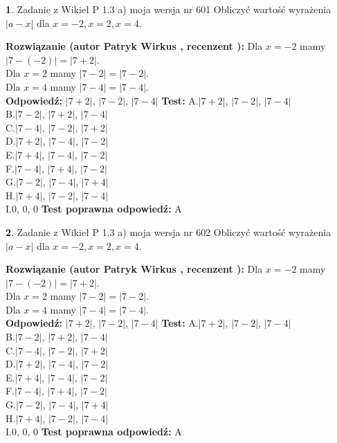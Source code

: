 \documentclass[12pt, a4paper]{article}
\theoremstyle{definition} %
\newtheorem{zad}{}
\newcommand{\zadStart}[1]{\begin{zad}#1\newline}
\newcommand{\zadStop}{\end{zad}}
\newcommand{\rozwStart}[2]{\noindent \textbf{Rozwiązanie (autor #1 , recenzent #2): }\newline}
\newcommand{\rozwStop}{\newline}
\newcommand{\odpStart}{\noindent \textbf{Odpowiedź:}\newline}
\newcommand{\odpStop}{\newline}
\newcommand{\testStart}{\noindent \textbf{Test:}\newline}
\newcommand{\testStop}{\newline}
\newcommand{\kluczStart}{\noindent \textbf{Test poprawna odpowiedź:}\newline}
\newcommand{\kluczStop}{\newline}
\begin{document}
\zadStart{Zadanie z Wikieł P 1.3 a) moja wersja nr 601}
Obliczyć wartość wyrażenia $|a - x|$ dla $x=-2,x=2,x=4$.
\zadStop
\rozwStart{Patryk Wirkus}{}
Dla $x = -2$ mamy $|7 - (-2)| = |7 + 2|$.\\
Dla $x = 2$ mamy $|7 - 2| = |7 - 2|$.\\
Dla $x = 4$ mamy $|7 - 4| = |7 - 4|$.\\
\rozwStop
\odpStart
$|7 + 2|$, $|7 - 2|$, $|7 - 4|$
\odpStop
\testStart
A.$|7 + 2|$, $|7 - 2|$, $|7 - 4|$\\
B.$|7 - 2|$, $|7 + 2|$, $|7 - 4|$\\
C.$|7 - 4|$, $|7 - 2|$, $|7 + 2|$\\
D.$|7 + 2|$, $|7 - 4|$, $|7 - 2|$\\
E.$|7 + 4|$, $|7 - 4|$, $|7 - 2|$\\
F.$|7 - 4|$, $|7 + 4|$, $|7 - 2|$\\
G.$|7 - 2|$, $|7 - 4|$, $|7 + 4|$\\
H.$|7 + 4|$, $|7 - 2|$, $|7 - 4|$\\
I.$0$, $0$, $0$
\testStop
\kluczStart
A
\kluczStop



\zadStart{Zadanie z Wikieł P 1.3 a) moja wersja nr 602}
Obliczyć wartość wyrażenia $|a - x|$ dla $x=-2,x=2,x=4$.
\zadStop
\rozwStart{Patryk Wirkus}{}
Dla $x = -2$ mamy $|7 - (-2)| = |7 + 2|$.\\
Dla $x = 2$ mamy $|7 - 2| = |7 - 2|$.\\
Dla $x = 4$ mamy $|7 - 4| = |7 - 4|$.\\
\rozwStop
\odpStart
$|7 + 2|$, $|7 - 2|$, $|7 - 4|$
\odpStop
\testStart
A.$|7 + 2|$, $|7 - 2|$, $|7 - 4|$\\
B.$|7 - 2|$, $|7 + 2|$, $|7 - 4|$\\
C.$|7 - 4|$, $|7 - 2|$, $|7 + 2|$\\
D.$|7 + 2|$, $|7 - 4|$, $|7 - 2|$\\
E.$|7 + 4|$, $|7 - 4|$, $|7 - 2|$\\
F.$|7 - 4|$, $|7 + 4|$, $|7 - 2|$\\
G.$|7 - 2|$, $|7 - 4|$, $|7 + 4|$\\
H.$|7 + 4|$, $|7 - 2|$, $|7 - 4|$\\
I.$0$, $0$, $0$
\testStop
\kluczStart
A
\kluczStop
\end{document}
